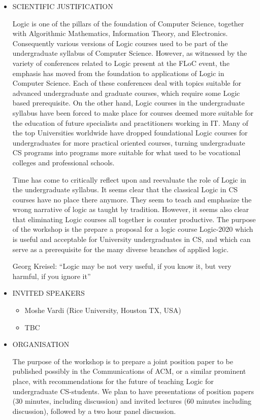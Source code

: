 \documentclass[prodmode,acmtecs]{acmsmall} %
\begin{document}
\begin{itemize}\item  SCIENTIFIC JUSTIFICATION 
 
  Logic is one of the pillars of the foundation of Computer Science, together with Algorithmic Mathematics, Information Theory, and Electronics. Consequently various versions of Logic courses used to be part of the undergraduate syllabus of Computer Science. However, as witnessed by the variety of conferences related to Logic present at the FLoC event, the emphasis has moved from the foundation to applications of Logic in Computer Science. Each of these conferences deal with topics suitable for advanced undergraduate and graduate courses, which require some Logic based prerequisite. On the other hand, Logic courses in the undergraduate syllabus have been forced to make place for courses deemed more suitable for the education of future specialists and practitioners working in IT. Many of the top Universities worldwide have dropped foundational Logic courses for undergraduates for more practical oriented courses, turning undergraduate CS programs into programs more suitable for what used to be vocational colleges and professional schools. 
 
  Time has come to critically reflect upon and reevaluate the role of Logic in the undergraduate syllabus. It seems clear that the classical Logic in CS courses have no place there anymore. They seem to teach and emphasize the wrong narrative of logic as taught by tradition. However, it seems also clear that eliminating Logic courses all together is counter productive. The purpose of the workshop is the prepare a proposal for a logic course Logic-2020 which is useful and acceptable for University undergraduates in CS, and which can serve as a prerequisite for the many diverse branches of applied logic. 
 
  Georg Kreisel: ``Logic may be not very useful, if you know it, but very harmful, if you ignore it''  
 
\item  INVITED SPEAKERS   
 
\begin{itemize}\item  Moshe Vardi (Rice University, Houston TX, USA) 
\item  TBC
\end{itemize} 
\item  ORGANISATION  
 
  The purpose of the workshop is to prepare a joint position paper to be published possibly in the Communications of ACM, or a similar prominent place, with recommendations for the future of teaching Logic for undergraduate CS-students. We plan to have presentations of position papers (30 minutes, including discussion) and invited lectures (60 minutes including discussion), followed by a two hour panel discussion. 
 

\end{itemize}
\end{document}
